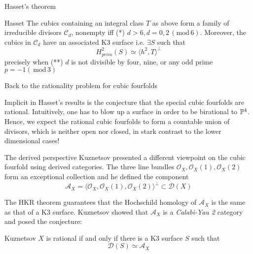 \documentclass[10pt]{beamer}
\begin{document}
\begin{frame}{Hasset's theorem}

    \begin{colorthm}{Hasset}{}
        The cubics containing an integral class $T$ as above form a family of irreducible divisors $\mathcal{C}_d$, nonempty iff (*) $d>6, d=0,2 \,( \mathrm{mod}\, 6)$. Moreover, the cubics in $\mathcal{C}_d$ have an associated K3 surface i.e. $\exists S$ such that $$H^2_{prim}(S)\simeq \langle h^2, T\rangle ^\perp$$
        precisely when (**) $d$ is not divisible by four, nine, or any odd prime $p =-1(\,\mathrm{ mod }\, 3)$
    \end{colorthm}
\end{frame}

\begin{frame}{Back to the rationality problem for cubic fourfolds}

    Implicit in Hasset's results is the conjecture that the special cubic fourfolds are rational. Intuitively, one has to blow up a surface in order to be birational to $\P^4$. Hence, we expect the rational cubic fourfolds to form a countable union of divisors, which is neither open nor closed, in stark contrast to the lower dimensional cases!
    
\end{frame}

\begin{frame}{The derived perspective}
    Kuznetsov presented a different viewpoint on the cubic fourfold using derived categories. The three line bundles $\mathcal{O}_X, \mathcal{O}_X(1), \mathcal{O}_X(2)$ form an exceptional collection and he defined the component $$\mathcal{A}_X=\langle \mathcal{O}_X, \mathcal{O}_X(1), \mathcal{O}_X(2)\rangle ^\perp\subset \mathcal{D}(X)$$\pause

    The HKR theorem guarantees that the Hochschild homology of $\mathcal{A}_X$ is the same as that of a K3 surface. \pause Kuznetsov showed that $\mathcal{A}_X$ is a \emph{Calabi-Yau 2} category and posed the conjecture:

    \begin{colorconj}{Kuznetsov}{}
        $X$ is rational if and only if there is a K3 surface $S$ such that $$\mathcal{D}(S)\simeq \mathcal{A}_X$$
    \end{colorconj}
    
\end{frame}
\end{document}
